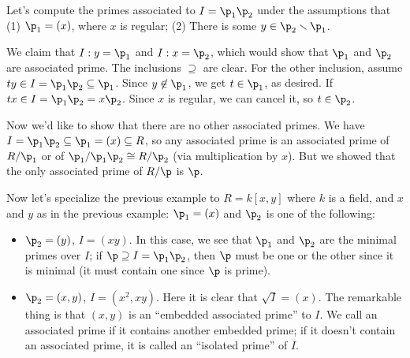  \begin{example}
   Let's compute the primes associated to $I=\p_1\p_2$ under the assumptions that (1)
   $\p_1=(x)$, where $x$ is regular; (2) There is some $y\in \p_2\smallsetminus \p_1$.

   We claim that $I:y=\p_1$ and $I:x=\p_2$, which would show that $\p_1$ and $\p_2$ are
   associated prime. The inclusions $\supseteq$ are clear. For the other inclusion,
   assume $ty\in I=\p_1\p_2\subseteq \p_1$. Since $y\not\in \p_1$, we get $t\in \p_1$, as
   desired. If $tx\in I=\p_1\p_2 = x\p_2$. Since $x$ is regular, we can cancel it, so
   $t\in \p_2$.

   Now we'd like to show that there are no other associated primes. We have
   $I=\p_1\p_2\subseteq \p_1=(x)\subseteq R$, so any associated prime is an associated
   prime of $R/\p_1$ or of $\p_1/\p_1\p_2\cong R/\p_2$ (via multiplication by $x$). But
   we showed that the only associated prime of $R/\p$ is $\p$.
 \end{example}
 \begin{example}
   Now let's specialize the previous example to $R=k[x,y]$ where $k$ is a field, and $x$
   and $y$ as in the previous example: $\p_1=(x)$ and $\p_2$ is one of the following:
   \begin{itemize}
     \item $\p_2=(y)$, $I=(xy)$. In this case, we see that $\p_1$ and $\p_2$ are the
     minimal primes over $I$; if $\p\supseteq I=\p_1\p_2$, then $\p$ must be one or the
     other since it is minimal (it must contain one since $\p$ is prime).

     \item $\p_2=(x,y)$, $I=(x^2,xy)$. Here it is clear that $\sqrt I=(x)$. The
     remarkable thing is that $(x,y)$ is an ``embedded associated prime'' to $I$. We call
     an associated prime if it contains another embedded prime; if it doesn't contain an
     associated prime, it is called an ``isolated prime'' of $I$.
   \end{itemize}
   \vspace*{-1.5\baselineskip}
 \end{example}

